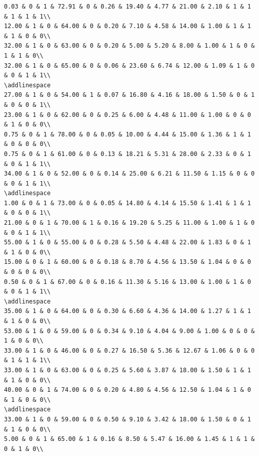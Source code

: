 \documentclass[
]{article}
\begin{document}
\begin{verbatim}
0.03 & 0 & 1 & 72.91 & 0 & 0.26 & 19.40 & 4.77 & 21.00 & 2.10 & 1 & 1 & 1 & 1 & 1\\
12.00 & 1 & 0 & 64.00 & 0 & 0.20 & 7.10 & 4.58 & 14.00 & 1.00 & 1 & 1 & 1 & 0 & 0\\
32.00 & 1 & 0 & 63.00 & 0 & 0.20 & 5.00 & 5.20 & 8.00 & 1.00 & 1 & 0 & 1 & 1 & 0\\
32.00 & 1 & 0 & 65.00 & 0 & 0.06 & 23.60 & 6.74 & 12.00 & 1.09 & 1 & 0 & 0 & 1 & 1\\
\addlinespace
27.00 & 1 & 0 & 54.00 & 1 & 0.07 & 16.80 & 4.16 & 18.00 & 1.50 & 0 & 1 & 0 & 0 & 1\\
23.00 & 1 & 0 & 62.00 & 0 & 0.25 & 6.00 & 4.48 & 11.00 & 1.00 & 0 & 0 & 1 & 0 & 0\\
0.75 & 0 & 1 & 78.00 & 0 & 0.05 & 10.00 & 4.44 & 15.00 & 1.36 & 1 & 1 & 0 & 0 & 0\\
0.75 & 0 & 1 & 61.00 & 0 & 0.13 & 18.21 & 5.31 & 28.00 & 2.33 & 0 & 1 & 0 & 1 & 1\\
34.00 & 1 & 0 & 52.00 & 0 & 0.14 & 25.00 & 6.21 & 11.50 & 1.15 & 0 & 0 & 0 & 1 & 1\\
\addlinespace
1.00 & 0 & 1 & 73.00 & 0 & 0.05 & 14.80 & 4.14 & 15.50 & 1.41 & 1 & 1 & 0 & 0 & 1\\
21.00 & 0 & 1 & 70.00 & 1 & 0.16 & 19.20 & 5.25 & 11.00 & 1.00 & 1 & 0 & 0 & 1 & 1\\
55.00 & 1 & 0 & 55.00 & 0 & 0.28 & 5.50 & 4.48 & 22.00 & 1.83 & 0 & 1 & 1 & 0 & 0\\
15.00 & 0 & 1 & 60.00 & 0 & 0.18 & 8.70 & 4.56 & 13.50 & 1.04 & 0 & 0 & 0 & 0 & 0\\
0.50 & 0 & 1 & 67.00 & 0 & 0.16 & 11.30 & 5.16 & 13.00 & 1.00 & 1 & 0 & 0 & 1 & 1\\
\addlinespace
35.00 & 1 & 0 & 64.00 & 0 & 0.30 & 6.60 & 4.36 & 14.00 & 1.27 & 1 & 1 & 1 & 0 & 0\\
53.00 & 1 & 0 & 59.00 & 0 & 0.34 & 9.10 & 4.04 & 9.00 & 1.00 & 0 & 0 & 1 & 0 & 0\\
33.00 & 1 & 0 & 46.00 & 0 & 0.27 & 16.50 & 5.36 & 12.67 & 1.06 & 0 & 0 & 1 & 1 & 1\\
33.00 & 1 & 0 & 63.00 & 0 & 0.25 & 5.60 & 3.87 & 18.00 & 1.50 & 1 & 1 & 1 & 0 & 0\\
40.00 & 0 & 1 & 74.00 & 0 & 0.20 & 4.80 & 4.56 & 12.50 & 1.04 & 1 & 0 & 1 & 0 & 0\\
\addlinespace
33.00 & 1 & 0 & 59.00 & 0 & 0.50 & 9.10 & 3.42 & 18.00 & 1.50 & 0 & 1 & 1 & 0 & 0\\
5.00 & 0 & 1 & 65.00 & 1 & 0.16 & 8.50 & 5.47 & 16.00 & 1.45 & 1 & 1 & 0 & 1 & 0\\

\end{verbatim}
\end{document}
